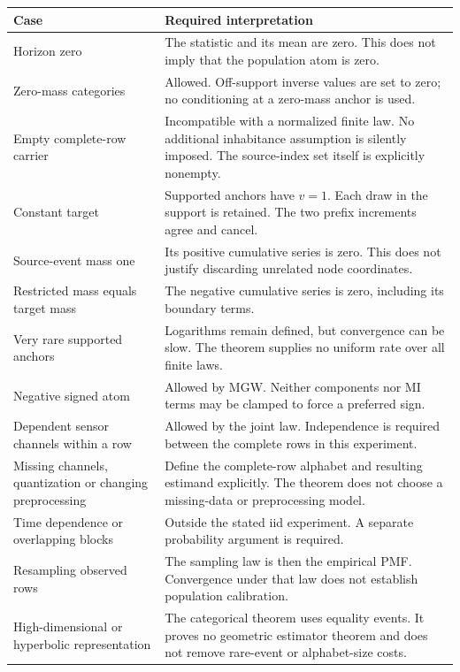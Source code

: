 \clearpage
{}\label{edge-cases-and-permitted-interpretations}

{\def\LTcaptype{none} %
\begin{longtable}[]{@{}
  >{\raggedright\arraybackslash}p{}
  >{\raggedright\arraybackslash}p{}@{}}
\toprule\noalign{}
\begin{minipage}[b]{\linewidth}\raggedright
Case
\end{minipage} & \begin{minipage}[b]{\linewidth}\raggedright
Required interpretation
\end{minipage} \\
\midrule\noalign{}
\endhead
\bottomrule\noalign{}
\endlastfoot
Horizon zero & The statistic and its mean are zero. This does not imply that the population atom is zero. \\
Zero-mass categories & Allowed. Off-support inverse values are set to zero; no conditioning at a zero-mass anchor is used. \\
Empty complete-row carrier & Incompatible with a normalized finite law. No additional inhabitance assumption is silently imposed. The source-index set itself is explicitly nonempty. \\
Constant target & Supported anchors have \(v=1\). Each draw in the support is retained. The two prefix increments agree and cancel. \\
Source-event mass one & Its positive cumulative series is zero. This does not justify discarding unrelated node coordinates. \\
Restricted mass equals target mass & The negative cumulative series is zero, including its boundary terms. \\
Very rare supported anchors & Logarithms remain defined, but convergence can be slow. The theorem supplies no uniform rate over all finite laws. \\
Negative signed atom & Allowed by MGW. Neither components nor MI terms may be clamped to force a preferred sign. \\
Dependent sensor channels within a row & Allowed by the joint law. Independence is required between the complete rows in this experiment. \\
Missing channels, quantization or changing preprocessing & Define the complete-row alphabet and resulting estimand explicitly. The theorem does not choose a missing-data or preprocessing model. \\
Time dependence or overlapping blocks & Outside the stated iid experiment. A separate probability argument is required. \\
Resampling observed rows & The sampling law is then the empirical PMF. Convergence under that law does not establish population calibration. \\
High-dimensional or hyperbolic representation & The categorical theorem uses equality events. It proves no geometric estimator theorem and does not remove rare-event or alphabet-size costs. \\
\end{longtable}
}

